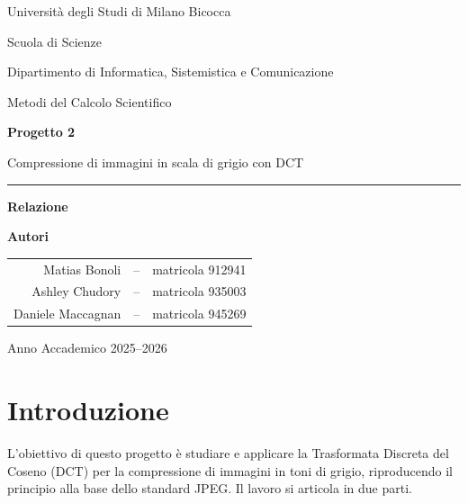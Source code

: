 \documentclass[11pt,a4paper]{article}
\begin{document}
\begin{titlepage}
\centering
\vspace*{2cm}

{\large Università degli Studi di Milano Bicocca\par}
{\large Scuola di Scienze\par}
{\large Dipartimento di Informatica, Sistemistica e Comunicazione\par}
\vspace{0.8cm}
{\large Metodi del Calcolo Scientifico\par}

\vspace{2.2cm}
{\Huge\bfseries Progetto 2\par}
\vspace{0.6cm}
{\Large Compressione di immagini in scala di grigio con DCT\par}

\vspace{2.2cm}
\rule{0.55\textwidth}{0.4pt}\par
\vspace{0.6cm}
{\large\bfseries Relazione\par}
\vspace{0.6cm}

\vspace{1.0cm}
{\Large \bfseries Autori\par}
\vspace{0.4cm}
{\large
\begin{tabular}{rcl}
Matias Bonoli & -- & matricola 912941 \\
Ashley Chudory & -- & matricola 935003 \\
Daniele Maccagnan & -- & matricola 945269
\end{tabular}\par
}

\vfill
{\large Anno Accademico 2025--2026\par}
\end{titlepage}

\tableofcontents
\newpage
\section{Introduzione}

L'obiettivo di questo progetto è studiare e applicare la Trasformata Discreta del Coseno
(DCT) per la compressione di immagini in toni di grigio, riproducendo il principio alla base dello
standard JPEG. Il lavoro si articola in due parti.
\end{document}

